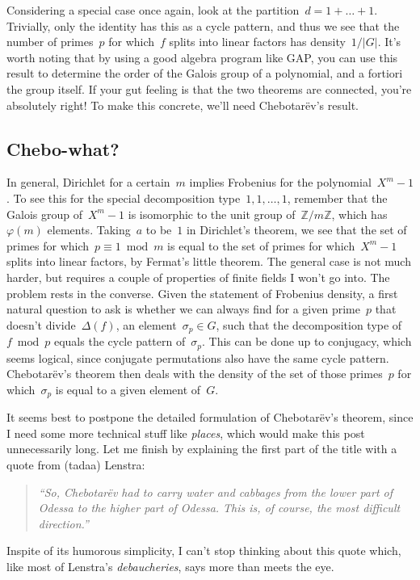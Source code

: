 Considering a special case once again, look at the partition~$d=1+\ldots+1$. Trivially, only the identity has this as a cycle pattern, and thus we see that the number of primes~$p$ for which~$f$ splits into linear factors has density~$1/\vert G \vert$. It's worth noting that by using a good algebra program like GAP{,} you can use this result to determine the order of the Galois group of a polynomial, and a fortiori the group itself. If your gut feeling is that the two theorems are connected, you're absolutely right! To make this concrete, we'll need Chebotar\"ev's result.

\subsection{Chebo-what?}

In general, Dirichlet for a certain~$m$ implies Frobenius for the polynomial~$X^{m}-1$. To see this for the special decomposition type~$1,1,\ldots,1$, remember that the Galois group of~$X^{m}-1$ is isomorphic to the unit group of~$\mathbb{Z}/m\mathbb{Z}$, which has~$\varphi(m)$ elements. Taking~$a$ to be~$1$ in Dirichlet's theorem, we see that the set of primes for which~$p \equiv 1\bmod m$ is equal to the set of primes for which~$X^{m}-1$ splits into linear factors, by Fermat's little theorem. The general case is not much harder, but requires a couple of properties of finite fields I won't go into. The problem rests in the converse. Given the statement of Frobenius density, a first natural question to ask is whether we can always find for a given prime~$p$ that doesn't divide~$\Delta(f)$, an element~$\sigma_{p} \in G$, such that the decomposition type of~$f\bmod p$ equals the cycle pattern of~$\sigma_{p}$. This can be done up to conjugacy, which seems logical, since conjugate permutations also have the same cycle pattern. Chebotar\"ev's theorem then deals with the density of the set of those primes~$p$ for which~$\sigma_{p}$ is equal to a given element of~$G$.

It seems best to postpone the detailed formulation of Chebotar\"ev's theorem, since I need some more technical stuff like \emph{places}, which would make this post unnecessarily long. Let me finish by explaining the first part of the title with a quote from (tadaa) Lenstra:
\begin{quote}
  \textsl{``So, Chebotar\"ev had to carry water and cabbages from the lower part of Odessa to the higher part of Odessa. This is, of course, the most difficult direction.''}
\end{quote}
Inspite of its humorous simplicity, I can't stop thinking about this quote which, like most of Lenstra's \emph{debaucheries}, says more than meets the eye.
